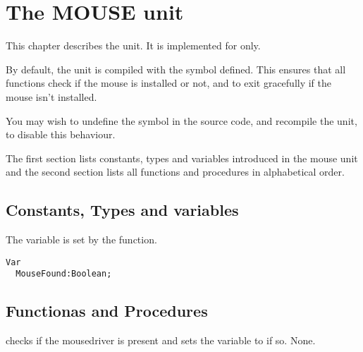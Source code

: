 %
%
%
%
%
\chapter{The MOUSE unit}
\label{ch:mouse}
This chapter describes the  unit. It is implemented for \dos only.

By default, the  unit is compiled with the  
symbol defined.
This ensures that all functions check if the mouse is installed or not, and
to exit gracefully if the mouse isn't installed.

You may wish to undefine the symbol in the source code, and recompile the
unit, to disable this behaviour.

The first section lists constants, types and variables introduced in the mouse unit
and the second section lists all functions and procedures in alphabetical
order.

\section{Constants, Types and variables}
The  variable is set by the  function.
\begin{verbatim}
Var
  MouseFound:Boolean;
\end{verbatim}

\section{Functionas and Procedures}

{ checks if the mousedriver is present and sets the
 variable to  if so.}
{None.}{}


